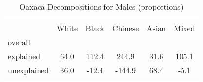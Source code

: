 \begin{table}[htbp]\centering
\caption{Oaxaca Decompositions for Males (proportions)}
\begin{tabular}{l*{5}{c}}
\hline\hline
          &         &         &         &         &         \\
          &    White&    Black&  Chinese&    Asian&    Mixed\\
\hline
overall   &         &         &         &         &         \\
explained &     64.0&    112.4&    244.9&     31.6&    105.1\\
unexplained&     36.0&    -12.4&   -144.9&     68.4&     -5.1\\
\hline\hline
\end{tabular}
\end{table}
